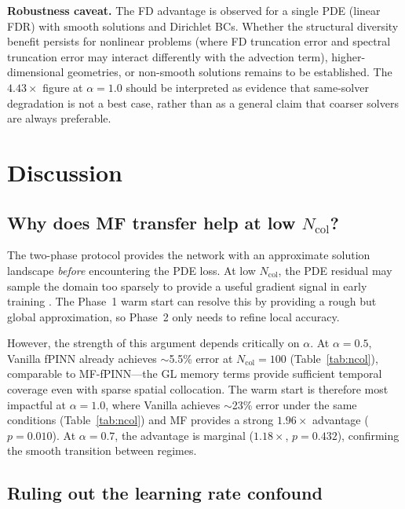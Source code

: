 \documentclass[preprint,12pt]{elsarticle}
\newcommand{\Ncol}{N_{\mathrm{col}}}
\begin{document}
\textbf{Robustness caveat.} The FD advantage is observed for a single PDE (linear FDR) with smooth solutions and Dirichlet BCs. Whether the structural diversity benefit persists for nonlinear problems (where FD truncation error and spectral truncation error may interact differently with the advection term), higher-dimensional geometries, or non-smooth solutions remains to be established. The $4.43\times$ figure at $\alpha = 1.0$ should be interpreted as evidence that same-solver degradation is not a best case, rather than as a general claim that coarser solvers are always preferable.

\section{Discussion}
\label{sec:discussion}

\subsection{Why does MF transfer help at low $\Ncol$?}

The two-phase protocol provides the network with an approximate solution landscape \emph{before} encountering the PDE loss. At low $\Ncol$, the PDE residual may sample the domain too sparsely to provide a useful gradient signal in early training \cite{wang2021understanding}. The Phase~1 warm start can resolve this by providing a rough but global approximation, so Phase~2 only needs to refine local accuracy.

However, the strength of this argument depends critically on $\alpha$. At $\alpha = 0.5$, Vanilla fPINN already achieves $\sim$5.5\% error at $\Ncol = 100$ (Table~\ref{tab:ncol}), comparable to MF-fPINN---the GL memory terms provide sufficient temporal coverage even with sparse spatial collocation. The warm start is therefore most impactful at $\alpha = 1.0$, where Vanilla achieves $\sim$23\% error under the same conditions (Table~\ref{tab:ncol}) and MF provides a strong $1.96\times$ advantage ($p = 0.010$). At $\alpha = 0.7$, the advantage is marginal ($1.18\times$, $p = 0.432$), confirming the smooth transition between regimes.

\subsection{Ruling out the learning rate confound}
\label{sec:lr_control}
\end{document}

